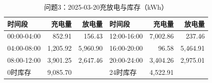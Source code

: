 \begin{table}[H]\centering\small\caption{问题3：2025-03-20充放电与库存（kWh）}\label{tab:q320250320b}
\begin{tabular}{lrrlrr}\toprule
时间段 & 充电量 & 放电量 & 时间段 & 充电量 & 放电量\\\midrule
00:00-04:00 & 852.91 & 156.43 & 12:00-16:00 & 7,002.86 & 237.46\\
04:00-08:00 & 1,205.92 & 5,960.90 & 16:00-20:00 & 96.58 & 5,464.91\\
08:00-12:00 & 3,901.25 & 2,647.46 & 20:00-24:00 & 3,404.26 & 2,975.01\\
0时库存 & 9,085.70 &  & 24时库存 & 4,522.91 & \\
\bottomrule\end{tabular}\end{table}
